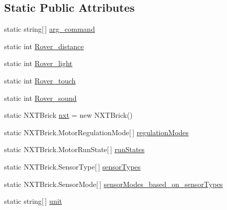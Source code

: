 \subsection*{Static Public Attributes}
\begin{CompactItemize}
\item 
static string\mbox{[}$\,$\mbox{]} \hyperlink{class_lego___mind_storm___control___api_1_1_n_x_t___r_o_v_e_r___c_o_n_t_r_o_l_e29e25d7d09a0528bb90cad108d833bb}{arg\_\-command}
\item 
static int \hyperlink{class_lego___mind_storm___control___api_1_1_n_x_t___r_o_v_e_r___c_o_n_t_r_o_l_94c73861419011bba4d378af6bcec076}{Rover\_\-distance}
\item 
static int \hyperlink{class_lego___mind_storm___control___api_1_1_n_x_t___r_o_v_e_r___c_o_n_t_r_o_l_9b985e7eea176ebff090d7c7bc9958a2}{Rover\_\-light}
\item 
static int \hyperlink{class_lego___mind_storm___control___api_1_1_n_x_t___r_o_v_e_r___c_o_n_t_r_o_l_9bf34ba155d6d669faeb9483e40b03a3}{Rover\_\-touch}
\item 
static int \hyperlink{class_lego___mind_storm___control___api_1_1_n_x_t___r_o_v_e_r___c_o_n_t_r_o_l_761497f10a4df11d56aa4d6f6fc5b9e5}{Rover\_\-sound}
\item 
static NXTBrick \hyperlink{class_lego___mind_storm___control___api_1_1_n_x_t___r_o_v_e_r___c_o_n_t_r_o_l_67421f92776a1d07805d109668ae1c9e}{nxt} = new NXTBrick()
\item 
static NXTBrick.MotorRegulationMode\mbox{[}$\,$\mbox{]} \hyperlink{class_lego___mind_storm___control___api_1_1_n_x_t___r_o_v_e_r___c_o_n_t_r_o_l_4d5eaa2042fa1f8c7e4e3429d215ec5a}{regulationModes}
\item 
static NXTBrick.MotorRunState\mbox{[}$\,$\mbox{]} \hyperlink{class_lego___mind_storm___control___api_1_1_n_x_t___r_o_v_e_r___c_o_n_t_r_o_l_9bf644fd25ad52c424fc34424082ba8b}{runStates}
\item 
static NXTBrick.SensorType\mbox{[}$\,$\mbox{]} \hyperlink{class_lego___mind_storm___control___api_1_1_n_x_t___r_o_v_e_r___c_o_n_t_r_o_l_6310330ac74f83d63f10da37df46b993}{sensorTypes}
\item 
static NXTBrick.SensorMode\mbox{[}$\,$\mbox{]} \hyperlink{class_lego___mind_storm___control___api_1_1_n_x_t___r_o_v_e_r___c_o_n_t_r_o_l_256595c0c0269d20153ba069f5184164}{sensorModes\_\-based\_\-on\_\-sensorTypes}
\item 
static string\mbox{[}$\,$\mbox{]} \hyperlink{class_lego___mind_storm___control___api_1_1_n_x_t___r_o_v_e_r___c_o_n_t_r_o_l_e4796f566a10c7f4906273166e3f17ab}{unit}

\end{CompactItemize}
